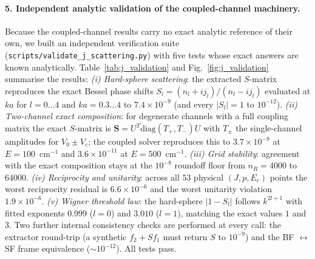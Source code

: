 \documentclass[11pt,a4paper]{article}
\newcommand{\cmi}{\ensuremath{\mathrm{cm}^{-1}}}
\begin{document}
\paragraph{5. Independent analytic validation of the coupled-channel machinery.}
Because the coupled-channel results carry no exact analytic reference of their own, we
built an independent verification suite (\texttt{scripts/validate\_j\_scattering.py}) with
five tests whose exact answers are known analytically. Table~\ref{tab:j_validation} and
Fig.~\ref{fig:j_validation} summarise the results:
\emph{(i) Hard-sphere scattering}: the extracted $S$-matrix reproduces the exact Bessel
phase shifts $S_l = (n_l + i j_l)/(n_l - i j_l)$ evaluated at $ka$ for $l=0\dots4$ and
$ka = 0.3\dots4$ to $7.4 \times 10^{-9}$ (and every $|S_l| = 1$ to $10^{-12}$).
\emph{(ii) Two-channel exact composition}: for degenerate channels with a full coupling
matrix the exact $S$-matrix is $\mathbf{S} = U^T \mathrm{diag}(T_+, T_-) U$ with
$T_\pm$ the single-channel amplitudes for $V_0 \pm V_c$; the coupled solver reproduces this
to $3.7 \times 10^{-9}$ at $E=100$~\cmi{} and $3.6 \times 10^{-11}$ at $E=500$~\cmi.
\emph{(iii) Grid stability}: agreement with the exact composition stays at the
$10^{-8}$ roundoff floor from $n_R = 4000$ to $64000$.
\emph{(iv) Reciprocity and unitarity}: across all $53$ physical $(J, p, E_c)$ points the
worst reciprocity residual is $6.6 \times 10^{-6}$ and the worst unitarity violation
$1.9 \times 10^{-6}$.
\emph{(v) Wigner threshold law}: the hard-sphere $|1 - S_l|$ follows $k^{2l+1}$ with fitted
exponents $0.999$ ($l=0$) and $3.010$ ($l=1$), matching the exact values $1$ and $3$.
Two further internal consistency checks are performed at every call: the extractor round-trip
(a synthetic $f_2 + S f_1$ must return $S$ to $10^{-9}$) and the BF $\leftrightarrow$ SF
frame equivalence ($\sim 10^{-12}$). All tests pass.
\end{document}
